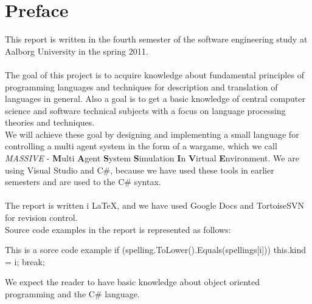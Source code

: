 \chapter*{Preface}
This report is written in the fourth semester of the software engineering study at Aalborg University in the spring 2011.
\\
\\
The goal of this project is to acquire knowledge about fundamental principles of programming languages and techniques for description and translation of languages in general. Also a goal is to get a basic knowledge of central computer science and software technical subjects with a focus on language processing theories and techniques.\\ \indent
  We will achieve these goal by designing and implementing a small language for controlling a multi agent system in the form of a wargame, which we call \textit{MASSIVE} - \textbf{M}ulti \textbf{A}gent \textbf{S}ystem \textbf{S}imulation \textbf{I}n \textbf{V}irtual \textbf{E}nvironment. We are using Visual Studio and C\#, because we have used these tools in earlier semesters and are used to the C\# syntax.
	\\
	\\
	The report is written i \LaTeX, and we have used Google Docs and TortoiseSVN for revision control.
	\\

Source code examples in the report is represented as follows:
\begin{source}{This is a sorce code example}{}
if (spelling.ToLower().Equals(spellings[i]))
	{
		this.kind = i;
		break;
	}
\end{source}

We expect the reader to have basic knowledge about object oriented programming and the C\# language.